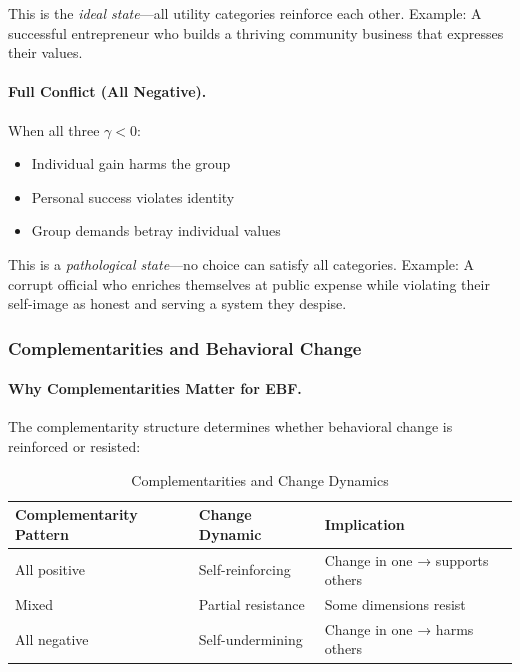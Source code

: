 This is the \emph{ideal state}---all utility categories reinforce each other.
Example: A successful entrepreneur who builds a thriving community business 
that expresses their values.

\paragraph{Full Conflict (All Negative).}
When all three $\gamma < 0$:
\begin{itemize}
\item Individual gain harms the group
\item Personal success violates identity
\item Group demands betray individual values
\end{itemize}

This is a \emph{pathological state}---no choice can satisfy all categories.
Example: A corrupt official who enriches themselves at public expense while 
violating their self-image as honest and serving a system they despise.

\subsubsection{Complementarities and Behavioral Change}

\paragraph{Why Complementarities Matter for EBF.}
The complementarity structure determines whether behavioral change is 
reinforced or resisted:

\begin{table}[htbp]
\centering
\caption{Complementarities and Change Dynamics}
\label{tab:complementarities-change}
\renewcommand{\arraystretch}{1.3}
\begin{tabular}{@{}lll@{}}
\toprule
\textbf{Complementarity Pattern} & \textbf{Change Dynamic} & \textbf{Implication} \\
\midrule
All positive & Self-reinforcing & Change in one → supports others \\
Mixed & Partial resistance & Some dimensions resist \\
All negative & Self-undermining & Change in one → harms others \\
\bottomrule
\end{tabular}
\end{table}

